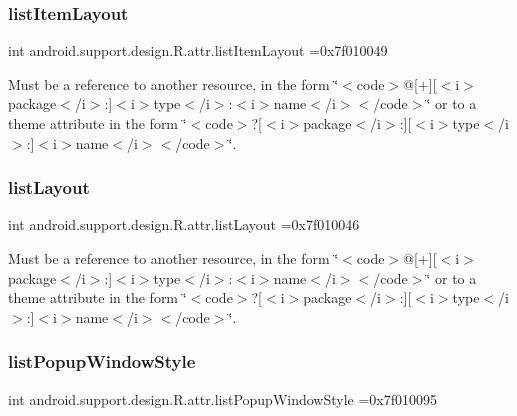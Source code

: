 \subsubsection{\texorpdfstring{list\+Item\+Layout}{listItemLayout}}
{\footnotesize\ttfamily int android.\+support.\+design.\+R.\+attr.\+list\+Item\+Layout =0x7f010049\hspace{0.3cm}{\ttfamily [static]}}

Must be a reference to another resource, in the form \char`\"{}$<$code$>$@\mbox{[}+\mbox{]}\mbox{[}$<$i$>$package$<$/i$>$\+:\mbox{]}$<$i$>$type$<$/i$>$\+:$<$i$>$name$<$/i$>$$<$/code$>$\char`\"{} or to a theme attribute in the form \char`\"{}$<$code$>$?\mbox{[}$<$i$>$package$<$/i$>$\+:\mbox{]}\mbox{[}$<$i$>$type$<$/i$>$\+:\mbox{]}$<$i$>$name$<$/i$>$$<$/code$>$\char`\"{}. \mbox{\label{classandroid_1_1support_1_1design_1_1R_1_1attr_abdf7b3a668401dcc8dfa7dc72c880f11}} 
\subsubsection{\texorpdfstring{list\+Layout}{listLayout}}
{\footnotesize\ttfamily int android.\+support.\+design.\+R.\+attr.\+list\+Layout =0x7f010046\hspace{0.3cm}{\ttfamily [static]}}

Must be a reference to another resource, in the form \char`\"{}$<$code$>$@\mbox{[}+\mbox{]}\mbox{[}$<$i$>$package$<$/i$>$\+:\mbox{]}$<$i$>$type$<$/i$>$\+:$<$i$>$name$<$/i$>$$<$/code$>$\char`\"{} or to a theme attribute in the form \char`\"{}$<$code$>$?\mbox{[}$<$i$>$package$<$/i$>$\+:\mbox{]}\mbox{[}$<$i$>$type$<$/i$>$\+:\mbox{]}$<$i$>$name$<$/i$>$$<$/code$>$\char`\"{}. \mbox{\label{classandroid_1_1support_1_1design_1_1R_1_1attr_ae687e51c2385efa82cabc4c678ebcdd5}} 
\subsubsection{\texorpdfstring{list\+Popup\+Window\+Style}{listPopupWindowStyle}}
{\footnotesize\ttfamily int android.\+support.\+design.\+R.\+attr.\+list\+Popup\+Window\+Style =0x7f010095\hspace{0.3cm}{\ttfamily [static]}}

